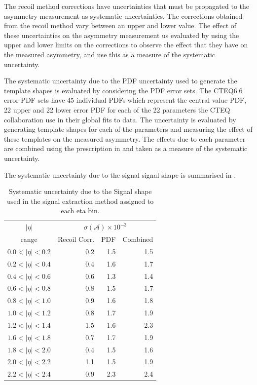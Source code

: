 The recoil method corrections have uncertainties that must be propagated to the
asymmetry measurement as systematic uncertainties.  The corrections obtained
from the recoil method vary between an upper and lower
value\cite{bauer2010modeling}. The effect of these uncertainties on the
asymmetry measurement us evaluated by using the upper and lower limits on the
corrections to observe the effect that they have on the measured asymmetry, and
use this as a measure of the systematic uncertainty.

The systematic uncertainty due to the {PDF} uncertainty used to generate the
template shapes is evaluated by considering the {PDF} error sets. The
CTEQ6.6\cite{lai2010vv} error {PDF} sets have 45 individual PDFs which represent
the central value {PDF}, 22 upper and 22 lower error {PDF} for each of the 22
parameters the CTEQ collaboration use in their global fits to data.  The
uncertainty is evaluated by generating template shapes for each of the
parameters and measuring the effect of these templates on the measured
asymmetry. The effects due to each parameter are combined using the
prescription in  and taken as a measure of the
systematic uncertainty.

The systematic uncertainty due to the signal \ETm signal shape is summarised in
.

\begin{table}[htbp]
\begin{center}
\begin{tabular}{crrr}
\toprule
$|\eta|$  & \multicolumn{3}{c}{$\sigma(\mathcal{A}) \times 10^{-3}$}\\
range     & Recoil Corr.& PDF & Combined \\
\midrule
$0.0<|\eta|<0.2$ &  0.2 &  1.5  & 1.5 \\
$0.2<|\eta|<0.4$ &  0.4 &  1.6  & 1.7 \\
$0.4<|\eta|<0.6$ &  0.6 &  1.3  & 1.4 \\
$0.6<|\eta|<0.8$ &  0.8 &  1.5  & 1.7 \\
$0.8<|\eta|<1.0$ &  0.9 &  1.6  & 1.8 \\
$1.0<|\eta|<1.2$ &  0.8 &  1.7  & 1.9 \\
$1.2<|\eta|<1.4$ &  1.5 &  1.6  & 2.3 \\
$1.6<|\eta|<1.8$ &  0.7 &  1.7  & 1.9 \\
$1.8<|\eta|<2.0$ &  0.4 &  1.5  & 1.6 \\
$2.0<|\eta|<2.2$ &  1.1 &  1.5  & 1.9 \\
$2.2<|\eta|<2.4$ &  0.9 &  2.3  & 2.4 \\
\bottomrule
\end{tabular}
\caption{\label{tab:updatedsystsig} Systematic uncertainty due to the Signal \MET shape
used in the signal extraction method assigned to each eta bin\cite{bendavid2011electron}.}
\end{center}
\end{table}

